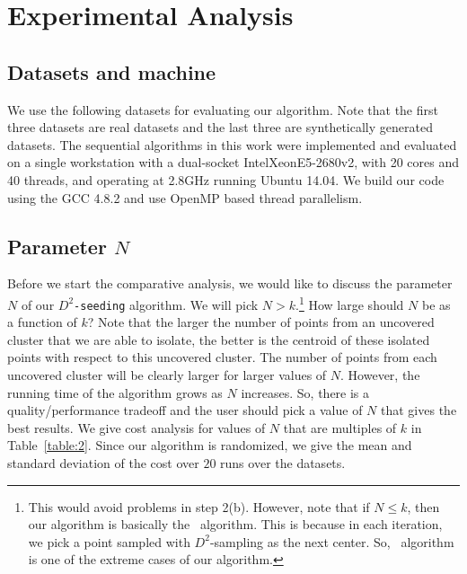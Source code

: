 \section{Experimental Analysis}

\subsection{Datasets and machine}
We use the following datasets for evaluating our algorithm.
Note that the first three datasets are real datasets and the last three are synthetically generated datasets.
The sequential algorithms in this work were implemented and evaluated on a single workstation with a dual-socket Intel\textregistered Xeon\textregistered E5-2680v2, with 20 cores and 40 threads, and operating at 2.8GHz running Ubuntu 14.04. We build our code using the GCC 4.8.2 and use OpenMP based thread parallelism.







\subsection{Parameter $N$}
Before we start the comparative analysis, we would like to discuss the parameter $N$ of our \texttt{$D^2$-seeding} algorithm.
We will pick $N > k$.\footnote{This would avoid problems in step 2(b).
However, note that if $N \leq k$, then our algorithm is basically the \kmpp\ algorithm. 
This is because in each iteration, we pick a point sampled with $D^2$-sampling as the next center.
So, \kmpp\ algorithm is one of the extreme cases of our algorithm.}
How large should $N$ be as a function of $k$? Note that the larger the number of points from an uncovered cluster that we are able to isolate, the better is the centroid of these isolated points with respect to this uncovered cluster. 
The number of points from each uncovered cluster will be clearly larger for larger values of $N$.
However, the running time of the algorithm grows as $N$ increases. 
So, there is a quality/performance tradeoff and the user should pick a value of $N$ that gives the best results.
We give cost analysis for values of $N$ that are multiples of $k$ in Table~\ref{table:2}.
Since our algorithm is randomized, we give the mean and standard deviation of the cost over $20$ runs over the datasets. 

